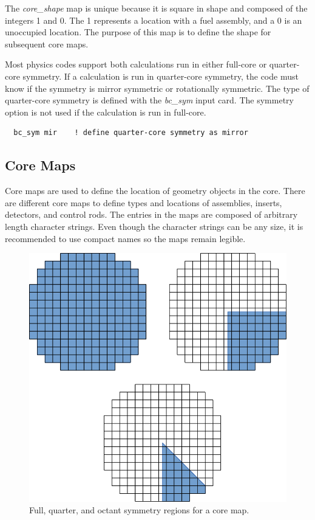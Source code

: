 The {\it core\_shape} map is unique because it is square in shape and composed of the integers 1 and 0.
The 1 represents a location with a fuel assembly, and a 0 is an unoccupied location.
The purpose of this map is to define the shape for subsequent core maps.

Most physics codes support both calculations run in either full-core or quarter-core symmetry.
If a calculation is run in quarter-core symmetry,  the code must know if the symmetry is
mirror symmetric or rotationally symmetric.  The type of quarter-core symmetry is defined with the {\it bc\_sym}
input card.  The symmetry option is not used if the calculation is run in full-core.
\begin{verbatim}
  bc_sym mir    ! define quarter-core symmetry as mirror
\end{verbatim}

\subsection{Core Maps}

Core maps are used to define the location of geometry objects in the core.
There are different core maps to define types and locations of assemblies,
inserts, detectors, and control rods.
The entries in the maps are composed of arbitrary length character strings.
Even though the character strings can be any size, it is recommended to use 
compact names so the maps remain legible.

\begin{figure}
\begin{center}
\includegraphics[width=5in]{figs/core_symmetry.pdf}
\end{center}
\caption{\label{fig:coresym} Full, quarter, and octant symmetry regions for a core map.}
\end{figure}

